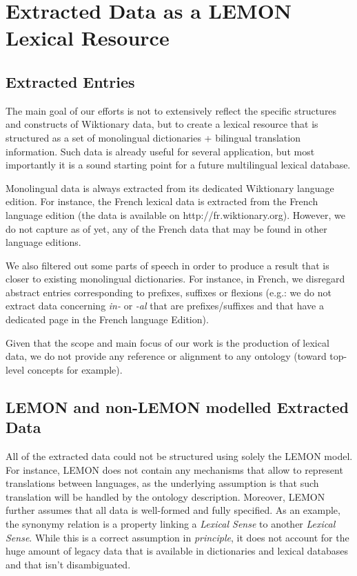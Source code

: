 \documentclass[10pt, a4paper]{article}
\begin{document}
\section{Extracted Data as a LEMON Lexical Resource}

\subsection{Extracted Entries}

The main goal of our efforts is not to extensively reflect the specific structures and constructs of Wiktionary data, but to create a lexical resource that is structured as a set of monolingual dictionaries + bilingual translation information. Such data is already useful for several application, but most importantly it is a sound starting point for a future multilingual lexical database.

Monolingual data is always extracted from its dedicated Wiktionary language edition. For instance, the French lexical data is extracted from the French language edition (the data is available on http://fr.wiktionary.org). However, we do not capture as of yet, any of the French data that may be found in other language editions.

We also filtered out some parts of speech in order to produce a result that is closer to existing monolingual dictionaries. For instance, in French, we disregard abstract entries corresponding to prefixes, suffixes or flexions (e.g.: we do not extract data concerning \textit{in-} or \textit{-al} that are prefixes/suffixes and that have a dedicated page in the French language Edition). 

Given that the scope and main focus of our work is the production of lexical data, we do not provide any reference or alignment to any ontology (toward top-level concepts for example).  



\subsection{LEMON and non-LEMON modelled Extracted Data}

All of the extracted data could not be structured using solely the LEMON model. For instance, LEMON does not contain any mechanisms that allow to represent translations between languages, as the underlying assumption is that such translation will be handled by the ontology description. Moreover, LEMON further assumes that all data is well-formed and fully specified. As an example, the synonymy relation is a property linking a \textit{Lexical Sense} to another \textit{Lexical Sense}. While this is a correct assumption in \textit{principle}, it does not account for the huge amount of legacy data that is available in dictionaries and lexical databases and that isn't disambiguated.
\end{document}

